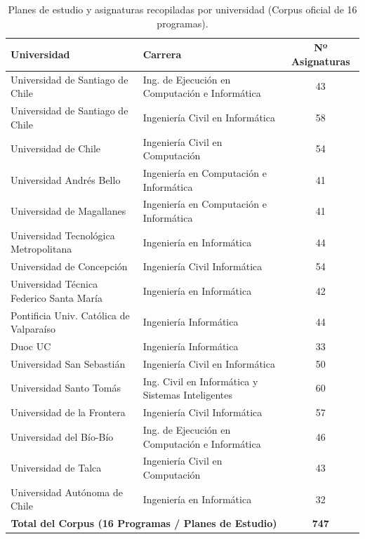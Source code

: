 \documentclass[11pt,a4paper]{article}
\begin{document}
\begin{small}
\begin{longtable}{p{5.8cm} p{6.6cm} c}
\caption{Planes de estudio y asignaturas recopiladas por universidad (Corpus oficial de 16 programas).} \label{tab:corpus} \\
\toprule
\textbf{Universidad} & \textbf{Carrera} & \textbf{Nº Asignaturas} \\
\midrule
\endhead
\bottomrule
\endfoot

Universidad de Santiago de Chile & Ing. de Ejecución en Computación e Informática & 43 \\
Universidad de Santiago de Chile & Ingeniería Civil en Informática & 58 \\
Universidad de Chile & Ingeniería Civil en Computación & 54 \\
Universidad Andrés Bello & Ingeniería en Computación e Informática & 41 \\
Universidad de Magallanes & Ingeniería en Computación e Informática & 41 \\
Universidad Tecnológica Metropolitana & Ingeniería en Informática & 44 \\
Universidad de Concepción & Ingeniería Civil Informática & 54 \\
Universidad Técnica Federico Santa María & Ingeniería en Informática & 42 \\
Pontificia Univ. Católica de Valparaíso & Ingeniería Informática & 44 \\
Duoc UC & Ingeniería Informática & 33 \\
Universidad San Sebastián & Ingeniería Civil en Informática & 50 \\
Universidad Santo Tomás & Ing. Civil en Informática y Sistemas Inteligentes & 60 \\
Universidad de la Frontera & Ingeniería Civil Informática & 57 \\
Universidad del Bío-Bío & Ing. de Ejecución en Computación e Informática & 46 \\
Universidad de Talca & Ingeniería Civil en Computación & 43 \\
Universidad Autónoma de Chile & Ingeniería en Informática & 32 \\
\midrule
\multicolumn{2}{r}{\textbf{Total del Corpus (16 Programas / Planes de Estudio)}} & \textbf{747} \\
\end{longtable}
\end{small}

\vspace{10pt}
\end{document}
